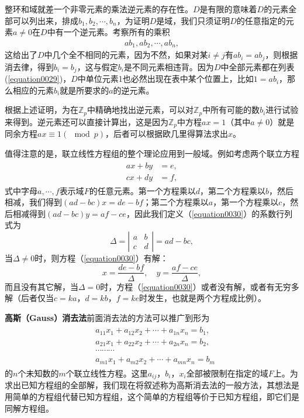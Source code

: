 整环和域就差一个非零元素的乘法逆元素的存在性。$D$是有限的意味着$D$的元素全部可以列出来，排成$b_1,b_2,\cdots,b_n$，为证明$D$是域，我们只须证明$D$的任意指定的元素$a \neq 0$在$D$中有一个逆元素。考察所有的乘积
\begin{gather}\label{equation0029}
ab_1, ab_2, \cdots, ab_n,
\end{gather}
这给出了$D$中几个全不相同的元素，因为不然，如果对某$i \neq j$有$ab_i = ab_j$，则根据消去律，得到$b_i=b_j$，这与假定$b_i$是不同元素相违背。因为$D$中全部元素都在列表(\ref{equation0029})，$D$中单位元素1也必然出现在表中某个位置上，比如$1 = ab_i$，那么相应的元素$b_i$就是所要求的$a$的逆元素。

根据上述证明，为在$\mathbb{Z}_p$中精确地找出逆元素，可以对$\mathbb{Z}_p$中所有可能的数$b_i$进行试验来得到。逆元素还可以直接计算出，这是因为$\mathbb{Z}_p$中方程$ax=1$（其中$a \neq 0$）就是同余方程$ax \equiv 1(\mod{p})$，后者可以根据欧几里得算法求出$x$。

值得注意的是，联立线性方程组的整个理论应用到一般域。例如考虑两个联立方程
\begin{gather} \label{equation0030}
\begin{aligned}
ax+by&=e,\\
cx+dy&=f,
\end{aligned}
\end{gather}
式中字母$a,\cdots,f$表示域$F$的任意元素。第一个方程乘以$d$，第二个方程乘以$b$，然后相减，我们得到$(ad-bc)x=de-bf$；第二个方程乘以$a$，第一个方程乘以$c$，然后相减得到$(ad-bc)y=af-ce$，因此我们定义（\ref{equation0030}）的系数行列式为
\[
\Delta=\left|\begin{array}{cc}
a & b \\
c & d
\end{array}\right|=ad-bc,
\]
当$\Delta \neq 0$时，则方程（\ref{equation0030}）有解：
\[
x = \frac{de-bf}{\Delta}, \quad y = \frac{af-ce}{\Delta},
\]
而且没有其它解，当$\Delta=0$时，方程（\ref{equation0030}）或者没有解，或者有无穷多解（后者仅当$c=ka$，$d=kb$，$f=ke$时发生，也就是两个方程成比例）。

\textbf{高斯（Gauss）消去法}\quad 前面消去法的方法可以推广到形为
\begin{gather}\label{equation0031}
\begin{aligned}
&a_{11}x_1+a_{12}x_2+\cdots+a_{1n}x_n=b_1,\\
&a_{21}x_1+a_{22}x_2+\cdots+a_{2n}x_n=b_2,\\
&\cdots\cdots\cdots\\
&a_{m1}x_1+a_{m2}x_2+\cdots+a_{mn}x_n=b_m
\end{aligned}
\end{gather}
的$n$个未知数的$m$个联立线性方程。这里$a_{ij}$，$b_i$，$x_i$全部被限制在指定的域$F$上。为求出已知方程组的全部解，我们现在将叙述称为高斯消去法的一般方法，其想法是用简单的方程组代替已知方程组，这个简单的方程组等价于已知方程组，即它们是同解方程组。

